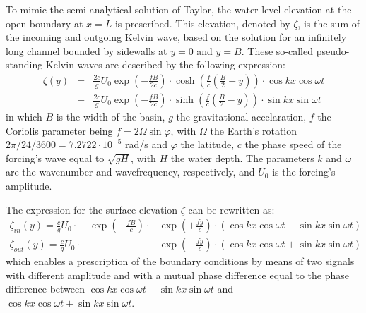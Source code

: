 To mimic the semi-analytical solution of Taylor, the water level elevation at the open boundary at $x=L$ is prescribed. This elevation, denoted by $\zeta$, is the sum of the incoming and outgoing Kelvin wave, based on the solution for an infinitely long channel bounded by sidewalls at $y = 0$ and $y = B$. These so-called pseudo-standing Kelvin waves are described by the following expression:
\begin{eqnarray}
\zeta(y) &=& \frac{2c}{g}U_0 \exp \left(-\frac{fB}{2c} \right) \cdot  \cosh \left(\frac{f}{c} \left(\frac{B}{2}-y \right) \right) \cdot \cos kx \cos \omega t   \\
         &+& \frac{2c}{g}U_0 \exp \left(-\frac{fB}{2c} \right) \cdot  \sinh \left(\frac{f}{c} \left(\frac{B}{2}-y \right) \right) \cdot \sin kx \sin \omega t 
\end{eqnarray}
in which $B$ is the width of the basin, $g$ the gravitational accelaration, $f$ the Coriolis parameter being $f = 2 \Omega \sin \varphi$, with $\Omega$ the Earth's rotation $2\pi/24/3600 = 7.2722\cdot10^{-5}$ rad/s and $\varphi$ the latitude, $c$ the phase speed of the forcing's wave equal to $\sqrt{gH}$, with $H$ the water depth. The parameters $k$ and $\omega$ are the wavenumber and wavefrequency, respectively, and $U_0$ is the forcing's amplitude.

The expression for the surface elevation $\zeta$ can be rewritten as:
\begin{eqnarray}
\zeta_{in}(y) = \frac{c}{g}U_0 \cdot &\exp \left(-\frac{fB}{c}\right) \cdot &\exp \left(+ \frac{fy}{c} \right) \cdot \left(\cos kx \cos \omega t - \sin kx \sin \omega t   \right) \\
\zeta_{out}(y) = \frac{c}{g}U_0 \cdot &  &\exp \left(-\frac{fy}{c} \right) \cdot \left(\cos kx \cos \omega t + \sin kx \sin \omega t   \right)
\end{eqnarray}
which enables a prescription of the boundary conditions by means of two signals with different amplitude and with a mutual phase difference equal to the phase difference between $\cos kx \cos \omega t - \sin kx \sin \omega t$ and $\cos kx \cos \omega t + \sin kx \sin \omega t$.


